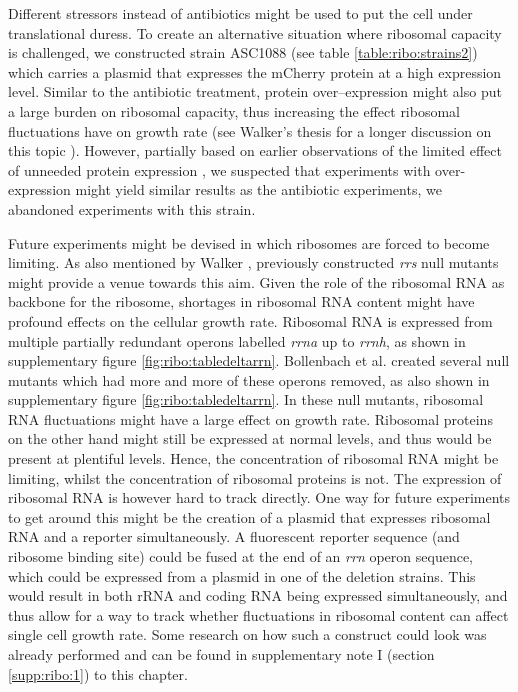 %
Different stressors instead of antibiotics might be used to put the cell under translational duress.
%
To create an alternative situation where ribosomal capacity is challenged, 
we constructed strain ASC1088 (see table \ref{table:ribo:strains2}) which carries a plasmid that expresses the mCherry protein at a high expression level.
%
Similar to the antibiotic treatment, protein over--expression might also put a large burden on ribosomal capacity, thus increasing the effect ribosomal fluctuations have on growth rate (see Walker's thesis for a longer discussion on this topic \cite{Walker2016t}).
%
However, partially based on earlier observations of the limited effect of unneeded protein expression \cite{Shachrai2010},
we suspected that experiments with over-expression might yield similar results as the antibiotic experiments, 
we abandoned experiments with this strain.

Future experiments might be devised in which ribosomes are forced to become limiting.
%
As also mentioned by Walker \cite{Walker2016t}, previously constructed \textit{rrs} null mutants \cite{Condon1993, Condon1995, Quan2015, Bollenbach2009, Gyorfy2015} might provide a venue towards this aim.
%
Given the role of the ribosomal RNA as backbone for the ribosome, shortages in ribosomal RNA content might have profound effects on the cellular growth rate.
%
Ribosomal RNA is expressed from multiple partially redundant operons labelled \textit{rrna} up to \textit{rrnh}, as shown in supplementary figure \ref{fig:ribo:tabledeltarrn}. 
%
Bollenbach et al. \cite{Bollenbach2009} created several null mutants which had more and more of these operons removed, as also shown in supplementary figure \ref{fig:ribo:tabledeltarrn}. 
%
In these null mutants, ribosomal RNA fluctuations might have a large effect on growth rate.
Ribosomal proteins on the other hand might still be expressed at normal levels, and thus would be present at plentiful levels.
Hence, the concentration of ribosomal RNA might be limiting, whilst the concentration of ribosomal proteins is not.
The expression of ribosomal RNA is however hard to track directly.
%
One way for future experiments to get around this might be the creation of a plasmid that expresses ribosomal RNA and a reporter simultaneously.
%
A fluorescent reporter sequence (and ribosome binding site) could be fused at the end of an \textit{rrn} operon sequence, which could be expressed from a plasmid in one of the deletion strains.
%
This would result in both rRNA and coding RNA being expressed simultaneously, and thus allow for a way to track whether 
fluctuations in ribosomal content can affect single cell growth rate.
%
Some research on how such a construct could look was already performed and can be found in supplementary note I (section \ref{supp:ribo:1}) to this chapter.


